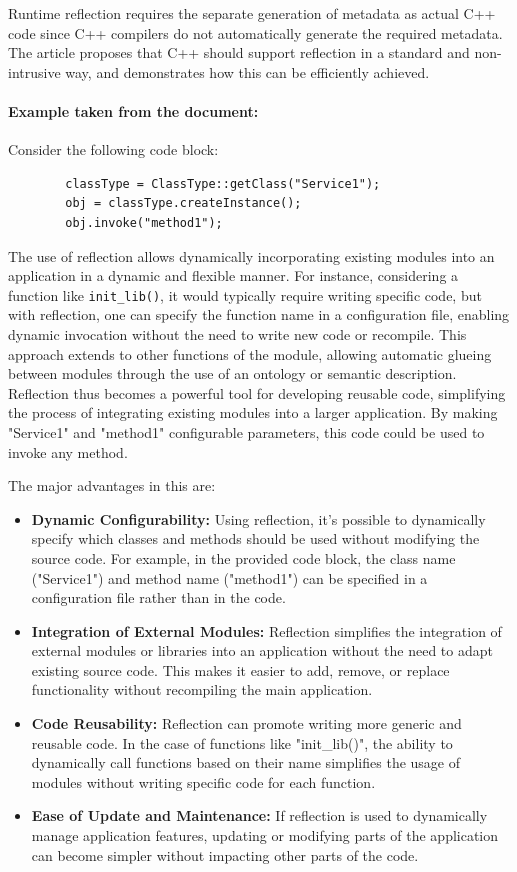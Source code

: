 \documentclass[11pt]{article}
\begin{document}
\begin{multicols*}{2}[\columnsep=1cm]
    Runtime reflection requires the separate generation of metadata as actual C++ code since C++ compilers do not automatically generate the required metadata. The article proposes that C++ should support reflection in a standard and non-intrusive way, and demonstrates how this can be efficiently achieved.
        
    \paragraph{Example taken from the document:}
    Consider the following code block:
    \begin{lstlisting}
        classType = ClassType::getClass("Service1");
        obj = classType.createInstance();
        obj.invoke("method1");
    \end{lstlisting}
    
    The use of reflection allows dynamically incorporating existing modules into an application in a dynamic and flexible manner. For instance, considering a function like \texttt{init\_lib()}, it would typically require writing specific code, but with reflection, one can specify the function name in a configuration file, enabling dynamic invocation without the need to write new code or recompile. This approach extends to other functions of the module, allowing automatic glueing between modules through the use of an ontology or semantic description. Reflection thus becomes a powerful tool for developing reusable code, simplifying the process of integrating existing modules into a larger application. By making "Service1" and "method1" configurable parameters, this code could be used to invoke any method.
    
    The major advantages in this are:
    \begin{itemize}
        \item \textbf{Dynamic Configurability:} Using reflection, it's possible to dynamically specify which classes and methods should be used without modifying the source code. For example, in the provided code block, the class name ("Service1") and method name ("method1") can be specified in a configuration file rather than in the code.
        \item \textbf{Integration of External Modules:} Reflection simplifies the integration of external modules or libraries into an application without the need to adapt existing source code. This makes it easier to add, remove, or replace functionality without recompiling the main application.
        \item \textbf{Code Reusability:} Reflection can promote writing more generic and reusable code. In the case of functions like "init\_lib()", the ability to dynamically call functions based on their name simplifies the usage of modules without writing specific code for each function.
        \item \textbf{Ease of Update and Maintenance:} If reflection is used to dynamically manage application features, updating or modifying parts of the application can become simpler without impacting other parts of the code.
    \end{itemize}

\end{multicols*}
\end{document}
